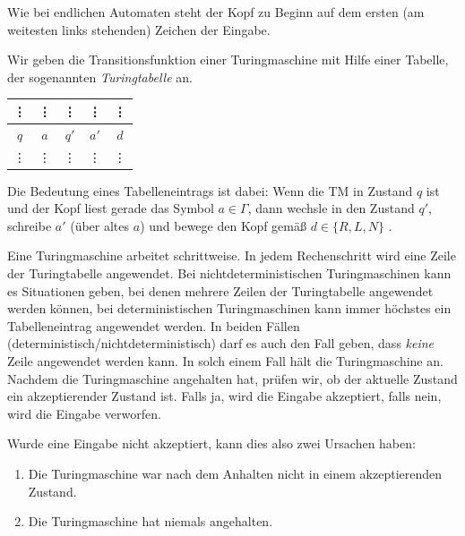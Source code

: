  Wie bei endlichen Automaten steht der Kopf zu Beginn auf dem ersten (am weitesten links stehenden) Zeichen der Eingabe.
 
 \smallskip
 
 Wir geben die Transitionsfunktion einer Turingmaschine mit Hilfe einer Tabelle, der sogenannten \emph{Turingtabelle} an.
 
 \begin{center}
	\begin{minipage}{40mm}
	\begin{tabular}[t]{|*5{c|}}
		\vdots & \vdots & \vdots & \vdots & \vdots \\\hline
		$q$ & $a$ & $q'$ & $a'$ & $d$ \\\hline
		\vdots & \vdots & \vdots & \vdots & \vdots 
	\end{tabular}
	\end{minipage}
	\begin{minipage}{96mm}
	 	Die Bedeutung eines Tabelleneintrags ist dabei: Wenn die \ac{TM} in Zustand $q$ ist und der Kopf liest
        gerade das Symbol $a\in\Gamma$, dann wechsle in den Zustand $q'$,
        schreibe $a'$ (über altes $a$) und bewege den Kopf gemäß
        $d\in\{R,L,N\}$ .
	\end{minipage}
\end{center}

Eine Turingmaschine arbeitet schrittweise.
In jedem Rechenschritt wird eine Zeile der Turingtabelle angewendet.
Bei nichtdeterministischen Turingmaschinen kann es Situationen geben, bei denen mehrere Zeilen der Turingtabelle angewendet werden können,
bei deterministischen Turingmaschinen kann immer höchstes ein Tabelleneintrag angewendet werden.
In beiden Fällen (deterministisch/nichtdeterministisch) darf es auch den Fall geben, dass \emph{keine} Zeile angewendet werden kann.
In solch einem Fall hält die Turingmaschine an.
Nachdem die Turingmaschine angehalten hat, prüfen wir, ob der aktuelle Zustand ein akzeptierender Zustand ist.
Falls ja, wird die Eingabe akzeptiert, falls nein, wird die Eingabe verworfen.

Wurde eine Eingabe nicht akzeptiert, kann dies also zwei Ursachen haben:
\begin{enumerate}
 \item Die Turingmaschine war nach dem Anhalten nicht in einem akzeptierenden Zustand.
 \item Die Turingmaschine hat niemals angehalten.
\end{enumerate}

